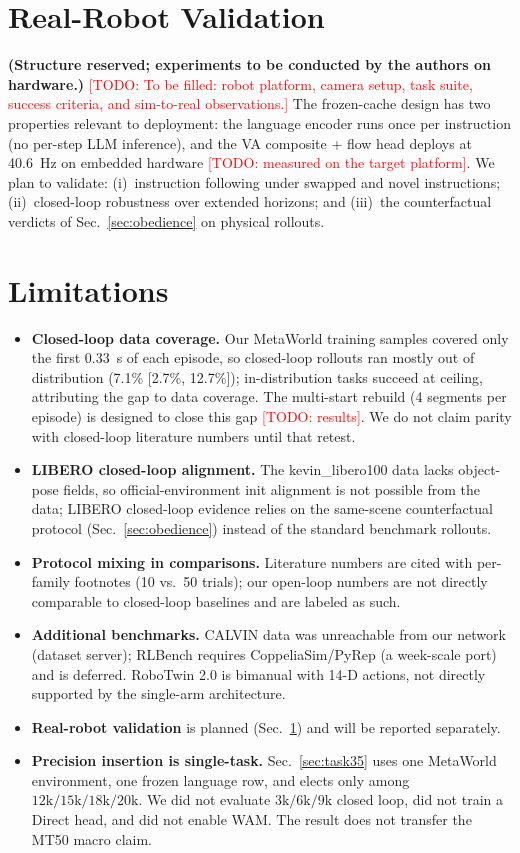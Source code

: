 \documentclass[10pt,twocolumn]{article}
\newcommand{\todo}[1]{\textcolor{red}{[TODO: #1]}}
\begin{document}
\section{Real-Robot Validation}
\label{sec:real}
\textbf{(Structure reserved; experiments to be conducted by the authors on
hardware.)} \todo{To be filled: robot platform, camera setup, task suite,
success criteria, and sim-to-real observations.} The frozen-cache design has
two properties relevant to deployment: the language encoder runs once per
instruction (no per-step LLM inference), and the VA composite + flow head
deploys at 40.6~Hz on embedded hardware \todo{measured on the target
platform}. We plan to validate: (i)~instruction following under swapped and
novel instructions; (ii)~closed-loop robustness over extended horizons; and
(iii)~the counterfactual verdicts of Sec.~\ref{sec:obedience} on physical
rollouts.

\section{Limitations}
\label{sec:limitations}
\begin{itemize}
\item \textbf{Closed-loop data coverage.} Our MetaWorld training samples
covered only the first 0.33~s of each episode, so closed-loop rollouts ran
mostly out of distribution (7.1\% [2.7\%, 12.7\%]); in-distribution tasks
succeed at ceiling, attributing the gap to data coverage. The multi-start
rebuild (4 segments per episode) is designed to close this gap
\todo{results}. We do not claim parity with closed-loop literature numbers
until that retest.
\item \textbf{LIBERO closed-loop alignment.} The kevin\_libero100 data lacks
object-pose fields, so official-environment init alignment is not possible
from the data; LIBERO closed-loop evidence relies on the same-scene
counterfactual protocol (Sec.~\ref{sec:obedience}) instead of the standard
benchmark rollouts.
\item \textbf{Protocol mixing in comparisons.} Literature numbers are cited
with per-family footnotes (10 vs.\ 50 trials); our open-loop numbers are not
directly comparable to closed-loop baselines and are labeled as such.
\item \textbf{Additional benchmarks.} CALVIN data was unreachable from our
network (dataset server); RLBench requires CoppeliaSim/PyRep (a week-scale
port) and is deferred. RoboTwin 2.0 is bimanual with 14-D actions, not
directly supported by the single-arm architecture.
\item \textbf{Real-robot validation} is planned (Sec.~\ref{sec:real}) and
will be reported separately.
\item \textbf{Precision insertion is single-task.}
Sec.~\ref{sec:task35} uses one MetaWorld environment, one frozen language
row, and elects only among $12\mathrm{k}/15\mathrm{k}/18\mathrm{k}/20\mathrm{k}$.
We did not evaluate $3\mathrm{k}/6\mathrm{k}/9\mathrm{k}$ closed loop, did
not train a Direct head, and did not enable WAM. The result does not
transfer the MT50 macro claim.
\end{itemize}
\end{document}
